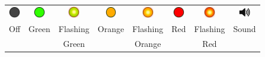 \documentclass[12pt, a4paper]{report}
\begin{document}
\vspace{1cm}

\begin{tabular}{c c c c c c c c}
	\includegraphics*[width=5mm]{off_led} & \includegraphics*[width=5mm]{green_led} & \includegraphics*[width=5mm]{green_led_flashing} & \includegraphics*[width=5mm]{orange_led} & \includegraphics*[width=5mm]{orange_led_flashing} & \includegraphics*[width=5mm]{red_led} & \includegraphics*[width=5mm]{red_led_flashing} &
	\includegraphics*[width=5mm]{speaker} \\
	Off & Green & Flashing & Orange & Flashing & Red & Flashing & Sound\\
	&& Green && Orange && Red & \\

\end{tabular}
\end{document}
